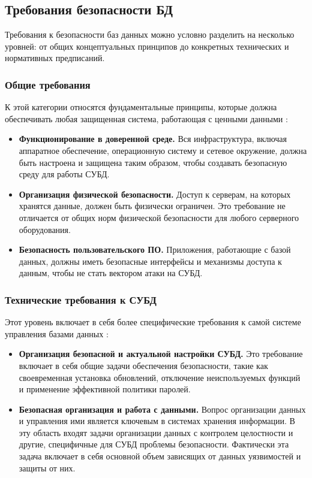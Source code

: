 \subsection{Требования безопасности БД}\label{sec:concept_security_requirements}
Требования к безопасности баз данных можно условно разделить на несколько уровней: от общих концептуальных принципов до конкретных технических и нормативных предписаний. 

\subsubsection{Общие требования}
К этой категории относятся фундаментальные принципы, которые должна обеспечивать любая защищенная система, работающая с ценными данными \autocite{LAPA, Pirogov2009}:
\begin{itemize}
    \item \textbf{Функционирование в доверенной среде.} Вся инфраструктура, включая аппаратное обеспечение, операционную систему и сетевое окружение, должна быть настроена и защищена таким образом, чтобы создавать безопасную среду для работы СУБД.
    \item \textbf{Организация физической безопасности.} Доступ к серверам, на которых хранятся данные, должен быть физически ограничен. Это требование не отличается от общих норм физической безопасности для любого серверного оборудования.
    \item \textbf{Безопасность пользовательского ПО.} Приложения, работающие с базой данных, должны иметь безопасные интерфейсы и механизмы доступа к данным, чтобы не стать вектором атаки на СУБД.
\end{itemize}

\subsubsection{Технические требования к СУБД}
Этот уровень включает в себя более специфические требования к самой системе управления базами данных \autocite{LAPA, Pirogov2009}:
\begin{itemize}
    \item \textbf{Организация безопасной и актуальной настройки СУБД.} Это требование включает в себя общие задачи обеспечения безопасности, такие как своевременная установка обновлений, отключение неиспользуемых функций и применение эффективной политики паролей.
    \item \textbf{Безопасная организация и работа с данными.} Вопрос организации данных и управления ими является ключевым в системах хранения информации. В эту область входят задачи организации данных с контролем целостности и другие, специфичные для СУБД проблемы безопасности. Фактически эта задача включает в себя основной объем зависящих от данных уязвимостей и защиты от них.
\end{itemize}

